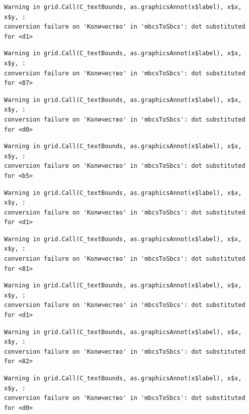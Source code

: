 \documentclass[
  letterpaper,
]{scrbook}
\theoremstyle{definition}
\theoremstyle{remark}
\begin{document}
\begin{verbatim}
Warning in grid.Call(C_textBounds, as.graphicsAnnot(x$label), x$x, x$y, :
conversion failure on 'Количество' in 'mbcsToSbcs': dot substituted for <d1>
\end{verbatim}

\begin{verbatim}
Warning in grid.Call(C_textBounds, as.graphicsAnnot(x$label), x$x, x$y, :
conversion failure on 'Количество' in 'mbcsToSbcs': dot substituted for <87>
\end{verbatim}

\begin{verbatim}
Warning in grid.Call(C_textBounds, as.graphicsAnnot(x$label), x$x, x$y, :
conversion failure on 'Количество' in 'mbcsToSbcs': dot substituted for <d0>
\end{verbatim}

\begin{verbatim}
Warning in grid.Call(C_textBounds, as.graphicsAnnot(x$label), x$x, x$y, :
conversion failure on 'Количество' in 'mbcsToSbcs': dot substituted for <b5>
\end{verbatim}

\begin{verbatim}
Warning in grid.Call(C_textBounds, as.graphicsAnnot(x$label), x$x, x$y, :
conversion failure on 'Количество' in 'mbcsToSbcs': dot substituted for <d1>
\end{verbatim}

\begin{verbatim}
Warning in grid.Call(C_textBounds, as.graphicsAnnot(x$label), x$x, x$y, :
conversion failure on 'Количество' in 'mbcsToSbcs': dot substituted for <81>
\end{verbatim}

\begin{verbatim}
Warning in grid.Call(C_textBounds, as.graphicsAnnot(x$label), x$x, x$y, :
conversion failure on 'Количество' in 'mbcsToSbcs': dot substituted for <d1>
\end{verbatim}

\begin{verbatim}
Warning in grid.Call(C_textBounds, as.graphicsAnnot(x$label), x$x, x$y, :
conversion failure on 'Количество' in 'mbcsToSbcs': dot substituted for <82>
\end{verbatim}

\begin{verbatim}
Warning in grid.Call(C_textBounds, as.graphicsAnnot(x$label), x$x, x$y, :
conversion failure on 'Количество' in 'mbcsToSbcs': dot substituted for <d0>
\end{verbatim}
\end{document}
